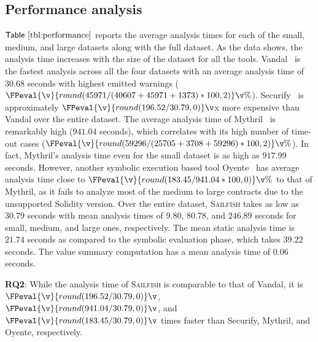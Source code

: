 \documentclass[conference, romanappendices]{tex/IEEEtran}
\theoremstyle{bfnote}
\newcommand{\toolname}{\textsc{Sailfish}\xspace}
\newcommand{\oyente}{{\sc Oyente}\xspace}
\newcommand{\securify}{{\sc Securify}\xspace}
\newcommand{\vandal}{{\sc Vandal}\xspace}
\newcommand{\solidity}{{\sc Solidity}\xspace}
\newcommand{\mythril}{{\sc Mythril}\xspace}
\newcommand{\Tbl}[1]{\ensuremath{\sf Table~\ref{#1}}}
\newcommand{\mythrilSafeDAO}{25705}
\newcommand{\mythrilUnsafeDAO}{3708}
\newcommand{\mythrilTimeout}{59296}
\newcommand{\vandalSafeDAO}{40607}
\newcommand{\vandalUnsafeDAO}{45971}
\newcommand{\vandalTimeout}{1373}
\newcommand{\securifyAnalysisTimeFull}{196.52}
\newcommand{\vandalAnalysisTimeFull}{30.68}
\newcommand{\mythrilAnalysisTimeSmall}{917.99}
\newcommand{\mythrilAnalysisTimeFull}{941.04}
\newcommand{\oyenteAnalysisTimeFull}{183.45}
\newcommand{\clintAnalysisTimeSmall}{9.80}
\newcommand{\clintAnalysisTimeMedium}{80.78}
\newcommand{\clintAnalysisTimeLarge}{246.89}
\newcommand{\clintAnalysisTimeFull}{30.79}
\newcommand{\clintAverageSATime}{21.74}
\newcommand{\clintAverageVSATime}{0.06}
\newcommand{\clintAverageSETime}{39.22}
\begin{document}
\subsection{Performance analysis}
\Tbl{tbl:performance} reports the average analysis times for each of the small, medium, and large datasets along with the full dataset.
As the data shows, the analysis time increases with the size of the dataset for all the tools.
\vandal~\cite{vandal} is the fastest analysis across all the four datasets with an average analysis time of $\vandalAnalysisTimeFull$ seconds with highest emitted warnings ($\FPeval{\v}{round(\vandalUnsafeDAO/(\vandalSafeDAO+\vandalUnsafeDAO+\vandalTimeout)*100,2)}\v\%$).
\securify~\cite{securify} is approximately $\FPeval{\v}{round(\securifyAnalysisTimeFull/\clintAnalysisTimeFull,0)}\v$x more expensive than \vandal{} over the entire dataset.
The average analysis time of \mythril~\cite{mythril} is remarkably high ($\mythrilAnalysisTimeFull$ seconds), which correlates with its high number of time-out cases ($\FPeval{\v}{round(\mythrilTimeout/(\mythrilSafeDAO+\mythrilUnsafeDAO+\mythrilTimeout)*100,2)}\v\%$).
In fact, \mythril 's analysis time even for the small dataset is as high as $\mythrilAnalysisTimeSmall$ seconds.
However, another symbolic execution based tool \oyente~\cite{oyente} 
has average analysis time 
close to $\FPeval{\v}{round(\oyenteAnalysisTimeFull/\mythrilAnalysisTimeFull*100,0)}\v\%$ to that of \mythril, as it fails to analyze most of the medium to large contracts due to the unsupported \solidity{} version.
Over the entire dataset, \toolname{} takes as low as $\clintAnalysisTimeFull$ seconds with mean analysis times of $\clintAnalysisTimeSmall$, $\clintAnalysisTimeMedium$, and $\clintAnalysisTimeLarge$ seconds for small, medium, and large ones, respectively.
The mean static analysis time is $\clintAverageSATime$ seconds
as compared to the symbolic evaluation phase, which takes $\clintAverageSETime$ seconds.
The value summary computation 
has a mean analysis time of $\clintAverageVSATime$ seconds.

\begin{mdframed}[style=graybox]
	\textbf{RQ2}: While the analysis time of \toolname is comparable to that of \vandal, it is $\FPeval{\v}{round(\securifyAnalysisTimeFull/\clintAnalysisTimeFull,0)}\v$, $\FPeval{\v}{round(\mythrilAnalysisTimeFull/\clintAnalysisTimeFull,0)}\v$, and $\FPeval{\v}{round(\oyenteAnalysisTimeFull/\clintAnalysisTimeFull,0)}\v$ times faster than \securify, \mythril, and \oyente, respectively.
\end{mdframed}
\vspace{-2mm}
\end{document}
